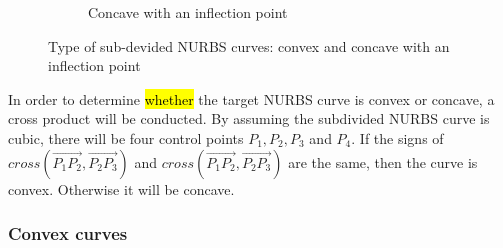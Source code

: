 \begin{figure}
\begin{subfigure}[b]{0.5\linewidth}
{            }
            \caption{Concave with an inflection point}
        \end{subfigure}
    \caption{Type of sub-devided NURBS curves: convex and concave with an inflection point}
    \label{qt_fig:iges_chord_ratio_nurbs}
    \end{figure}
%
In order to determine \hl{whether} the target NURBS curve is convex or concave, a cross product will be conducted.
By assuming the subdivided NURBS curve is cubic, there will be four control points $P_1,P_2,P_3$ and $P_4$.
If the signs of $cross(\overrightarrow{P_1P_2},\overrightarrow{P_2P_3})$ and $cross(\overrightarrow{P_1P_2},\overrightarrow{P_2P_3})$ are the same, then the curve is convex.
Otherwise it will be concave.

\subsubsection{Convex curves}
\label{qt_ssc:convex_curves}
